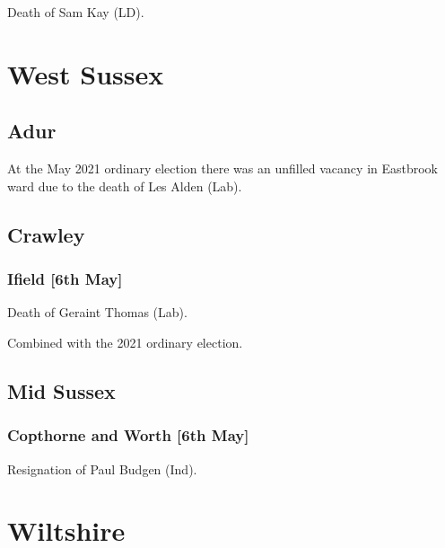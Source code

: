 \documentclass[a4paper,openany]{book}
\begin{document}
\begin{resultsiii}

Death of Sam Kay (LD).

\section{West Sussex}

\subsection*{Adur}

At the May 2021 ordinary election there was an unfilled vacancy in Eastbrook ward due to the death of Les Alden (Lab).

\subsection*{Crawley}

\subsubsection*{Ifield \hspace*{\fill}\nolinebreak[1]%
	\enspace\hspace*{\fill}
	[6th May]}


Death of Geraint Thomas (Lab).

Combined with the 2021 ordinary election.

\subsection*{Mid Sussex}

\subsubsection*{Copthorne and Worth \hspace*{\fill}\nolinebreak[1]%
	\enspace\hspace*{\fill}
	[6th May]}


Resignation of Paul Budgen (Ind).

\section{Wiltshire}


\end{resultsiii}
\end{document}
